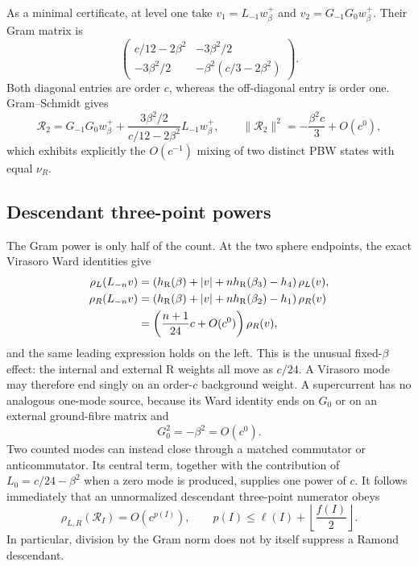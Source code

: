\documentclass[11pt]{article}
\newcommand{\R}{\mathrm R}
\begin{document}
As a minimal certificate, at level one take
\(v_1=L_{-1}w_\beta^+\) and
\(v_2=G_{-1}G_0w_\beta^+\).  Their Gram matrix is
\begin{equation}
 \begin{pmatrix}
 c/12-2\beta^2&-3\beta^2/2\\
 -3\beta^2/2&-\beta^2(c/3-2\beta^2)
 \end{pmatrix}.
 \label{eq:ramond-level-one-gram-schmidt-example}
\end{equation}
Both diagonal entries are order \(c\), whereas the off-diagonal entry is
order one.  Gram--Schmidt gives
\begin{equation}
 \mathcal R_2
 =G_{-1}G_0w_\beta^+
 +\frac{3\beta^2/2}{c/12-2\beta^2}L_{-1}w_\beta^+,
 \qquad
 \|\mathcal R_2\|^2=-\frac{\beta^2c}{3}+O(c^0),
 \label{eq:ramond-level-one-orthogonal-state}
\end{equation}
which exhibits explicitly the \(O(c^{-1})\) mixing of two distinct PBW
states with equal \(\nu_R\).

\subsection{Descendant three-point powers}

The Gram power is only half of the count.  At the two sphere endpoints,
the exact Virasoro Ward identities give
\begin{align}
 \rho_L(L_{-n}v)
 &=\left(h_\R(\beta)+|v|+n h_\R(\beta_3)-h_4\right)\rho_L(v),
 \notag\\
 \rho_R(L_{-n}v)
 &=\left(h_\R(\beta)+|v|+n h_\R(\beta_2)-h_1\right)\rho_R(v)
 \notag\\
 &=\left(\frac{n+1}{24}c+O(c^0)\right)\rho_R(v),
 \label{eq:precontract-virasoro-source}
\end{align}
and the same leading expression holds on the left.  This is the unusual
fixed-\(\beta\) effect: the internal and external R weights all move as
\(c/24\).  A Virasoro mode may therefore end singly on an order-\(c\)
background weight.  A supercurrent has no analogous one-mode source,
because its Ward identity ends on \(G_0\) or on an external ground-fibre
matrix and
\begin{equation}
 G_0^2=-\beta^2=O(c^0).
 \label{eq:precontract-finite-g0}
\end{equation}
Two counted modes can instead close through a matched commutator or
anticommutator.  Its central term, together with the contribution of
\(L_0=c/24-\beta^2\) when a zero mode is produced, supplies one power of
\(c\).  It follows immediately that
an unnormalized descendant three-point numerator obeys
\begin{equation}
 \rho_{L,R}(\mathcal R_I)
 =O\!\left(c^{p(I)}\right),
 \qquad
 p(I)\leq \ell(I)+\left\lfloor\frac{f(I)}2\right\rfloor .
 \label{eq:precontract-raw-three-point-bound}
\end{equation}
In particular, division by the Gram norm does not by itself suppress a
Ramond descendant.
\end{document}
